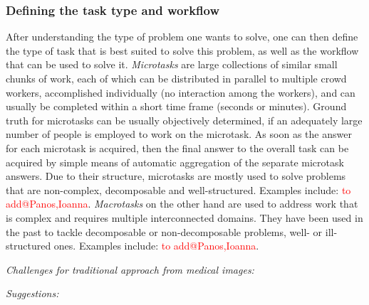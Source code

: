 \documentclass[10pt,twocolumn,letterpaper]{article}
\begin{document}
\subsubsection{Defining the task type and workflow}
After understanding the type of problem one wants to solve, one can then define the type of task that is best suited to solve this problem, as well as the workflow that can be used to solve it. \textit{Microtasks} are large collections of similar small chunks of work, each of which can be distributed in parallel to multiple crowd workers, accomplished individually (no interaction among the workers), and can usually be completed within a short time frame (seconds or minutes). Ground truth for microtasks can be usually objectively determined, if an adequately large number of people is employed to work on the microtask. As soon as the answer for each microtask is acquired, then the final answer to the overall task can be acquired by simple means of automatic aggregation of the separate microtask answers. Due to their structure, microtasks are mostly used to solve problems that are non-complex, decomposable and well-structured. Examples include: \textcolor{red}{to add@Panos,Ioanna}. \textit{Macrotasks} on the other hand are used to address work that is complex and requires multiple interconnected domains. They have been used in the past to tackle decomposable or non-decomposable problems, well- or ill-structured ones. Examples include: \textcolor{red}{to add@Panos,Ioanna}.

\emph{Challenges for traditional approach from medical images:}

\emph{Suggestions:}
\end{document}
